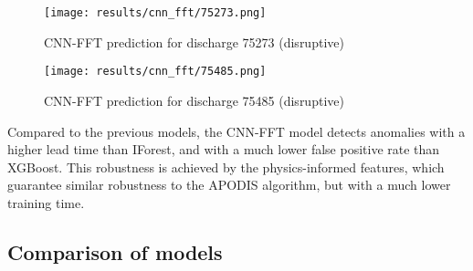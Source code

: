 \begin{figure}[H]
    \centering
    \texttt{[image: results/cnn\_fft/75273.png]}
    \caption{CNN-FFT prediction for discharge 75273 (disruptive)}
    \label{fig:cnn-fft-75273}
\end{figure}

\begin{figure}[H]
    \centering
    \texttt{[image: results/cnn\_fft/75485.png]}
    \caption{CNN-FFT prediction for discharge 75485 (disruptive)}
    \label{fig:cnn-fft-75485}
\end{figure}

Compared to the previous models, the CNN-FFT model detects anomalies with a higher lead time than \ac{IForest}, and with a much lower false positive rate than XGBoost. This robustness is achieved by the physics-informed features, which guarantee similar robustness to the \ac{APODIS} algorithm, but with a much lower training time.

\subsection{Comparison of models}




